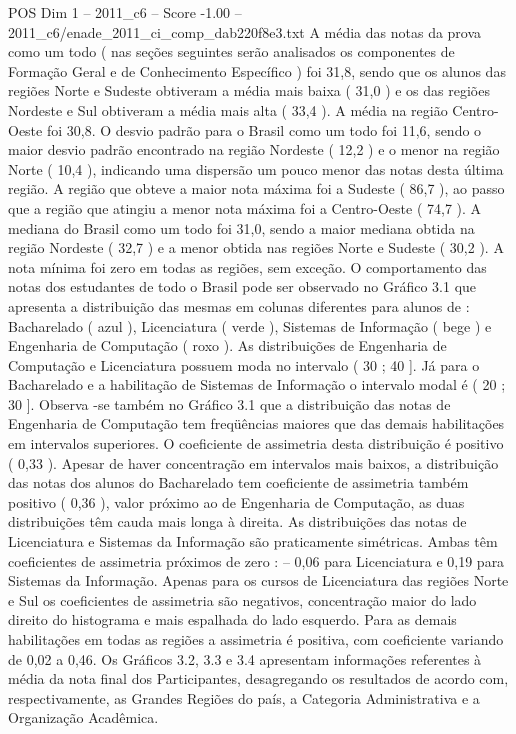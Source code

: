 \begin{textsample}{POS Dim 1 – 2011\_c6 – Score -1.00 – 2011\_c6/enade\_2011\_ci\_comp\_dab220f8e3.txt}
A média das notas da prova como um todo ( nas seções seguintes serão analisados os componentes de Formação Geral e de Conhecimento Específico ) foi 31,8, sendo que os alunos das regiões Norte e Sudeste obtiveram a média mais baixa ( 31,0 ) e os das regiões Nordeste e Sul obtiveram a média mais alta ( 33,4 ).
A média na região Centro-Oeste foi 30,8.
O desvio padrão para o Brasil como um todo foi 11,6, sendo o maior desvio padrão encontrado na região Nordeste ( 12,2 ) e o menor na região Norte ( 10,4 ), indicando uma dispersão um pouco menor das notas desta última região.
A região que obteve a maior nota máxima foi a Sudeste ( 86,7 ), ao passo que a região que atingiu a menor nota máxima foi a Centro-Oeste ( 74,7 ).
A mediana do Brasil como um todo foi 31,0, sendo a maior mediana obtida na região Nordeste ( 32,7 ) e a menor obtida nas regiões Norte e Sudeste ( 30,2 ).
A nota mínima foi zero em todas as regiões, sem exceção.
O comportamento das notas dos estudantes de todo o Brasil pode ser observado no Gráfico 3.1 que apresenta a distribuição das mesmas em colunas diferentes para alunos de : Bacharelado ( azul ), Licenciatura ( verde ), Sistemas de Informação ( bege ) e Engenharia de Computação ( roxo ).
As distribuições de Engenharia de Computação e Licenciatura possuem moda no intervalo ( 30 ; 40 ].
Já para o Bacharelado e a habilitação de Sistemas de Informação o intervalo modal é ( 20 ; 30 ].
Observa -se também no Gráfico 3.1 que a distribuição das notas de Engenharia de Computação tem freqüências maiores que das demais habilitações em intervalos superiores.
O coeficiente de assimetria desta distribuição é positivo ( 0,33 ).
Apesar de haver concentração em intervalos mais baixos, a distribuição das notas dos alunos do Bacharelado tem coeficiente de assimetria também positivo ( 0,36 ), valor próximo ao de Engenharia de Computação, as duas distribuições têm cauda mais longa à direita.
As distribuições das notas de Licenciatura e Sistemas da Informação são praticamente simétricas.
Ambas têm coeficientes de assimetria próximos de zero : – 0,06 para Licenciatura e 0,19 para Sistemas da Informação.
Apenas para os cursos de Licenciatura das regiões Norte e Sul os coeficientes de assimetria são negativos, concentração maior do lado direito do histograma e mais espalhada do lado esquerdo.
Para as demais habilitações em todas as regiões a assimetria é positiva, com coeficiente variando de 0,02 a 0,46.
Os Gráficos 3.2, 3.3 e 3.4 apresentam informações referentes à média da nota final dos Participantes, desagregando os resultados de acordo com, respectivamente, as Grandes Regiões do país, a Categoria Administrativa e a Organização Acadêmica.

\end{textsample}
